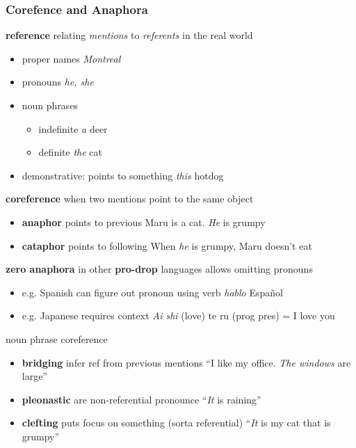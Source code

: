 \documentclass[]{article}
\theoremstyle{definition}
\begin{document}
\subsubsection{Corefence and Anaphora}%
\label{ssub:corefence_and_anaphora}

\textbf{reference} relating \textit{mentions} to \textit{referents} in the real world
\begin{itemize}
    \item proper names \textit{Montreal}
    \item pronouns \textit{he, she}
    \item noun phrases
        \begin{itemize}
            \item indefinite \textit{a} deer
            \item definite \textit{the} cat
        \end{itemize}
    \item demonstrative: points to something \textit{this} hotdog
\end{itemize}

\textbf{coreference} when two mentions point to the same object
\begin{itemize}
    \item \textbf{anaphor} points to previous Maru is a cat. \textit{He} is grumpy
    \item \textbf{cataphor} points to following When \textit{he} is grumpy, Maru doesn't eat
\end{itemize}

\textbf{zero anaphora} in other \textbf{pro-drop} languages allows omitting pronouns
\begin{itemize}
    \item e.g. Spanish can figure out pronoun using verb \textit{hablo} Español
    \item e.g. Japanese requires context \textit{Ai shi} (love) te ru (prog pres) = I love you
\end{itemize}

noun phrase coreference
\begin{itemize}
    \item \textbf{bridging} infer ref from previous mentions ``I like my office. \textit{The windows} are large''
    \item \textbf{pleonastic} are non-referential pronounce ``\textit{It} is raining''
    \item \textbf{clefting} puts focus on something (sorta referential) ``\textit{It} is my cat that is grumpy''
\end{itemize}
\end{document}
